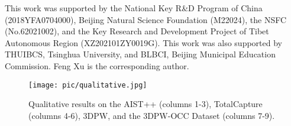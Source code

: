 \documentclass[sigconf,nonacm=true]{acmart}
\begin{document}
\begin{acks}
%
This work was supported by the National Key R\&D Program of China (2018YFA0704000), Beijing Natural Science Foundation (M22024), the NSFC (No.62021002), and the Key Research and Development Project of Tibet Autonomous Region (XZ202101ZY0019G).
%
This work was also supported by THUIBCS, Tsinghua University, and BLBCI, Beijing Municipal Education Commission.
%
Feng Xu is the corresponding author.
%
\end{acks}



\begin{figure*}
\texttt{[image: pic/qualitative.jpg]}
  \centering
  \caption{
   Qualitative results on the AIST++ (columns 1-3), TotalCapture (columns 4-6), 3DPW, and the 3DPW-OCC Dataset (columns 7-9).}
  \label{fig:comparison}
\end{figure*}
\end{document}
